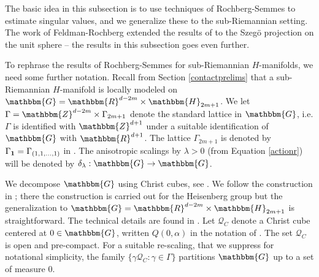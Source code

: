 \documentclass[10pt]{amsart}
\theoremstyle{remark}
\theoremstyle{definition}
\begin{document}
The basic idea in this subsection is to use techniques of Rochberg-Semmes \cite{rochbergsemmes} to estimate singular values, and we generalize these to the sub-Riemannian setting. The work of Feldman-Rochberg \cite{feldmanrochberg} extended the results of \cite{rochbergsemmes} to the Szeg\"o projection on the unit sphere -- the results in this subsection goes even further. 

To rephrase the results of Rochberg-Semmes for sub-Riemannian $H$-manifolds, we need some further notation. Recall from Section \ref{contactprelims} that a sub-Riemannian $H$-manifold is locally modeled on $\mathbbm{G}={\mathbbm{R}}^{d-2m}\times \mathbbm{H}_{2m+1}$. We let $\Gamma={\mathbbm{Z}}^{d-2m}\times \Gamma_{2m+1}$ denote the standard lattice in $\mathbbm{G}$, i.e. $\Gamma$ is identified with ${\mathbbm{Z}}^{d+1}$ under a suitable identification of $\mathbbm{G}$ with ${\mathbbm{R}}^{d+1}$. The lattice $\Gamma_{2m+1}$ is denoted by $\Gamma_{\bf 1}=\Gamma_{(1,1,\ldots,1)}$ in \cite{follandcr}. The anisotropic scalings by $\lambda>0$ (from Equation \eqref{actionr}) will be denoted by $\delta_\lambda:\mathbbm{G}\to \mathbbm{G}$. 

We decompose $\mathbbm{G}$ using Christ cubes, see \cite{christcubepap}. We follow the construction in \cite[Section 2.C1]{meyersonpaper}; there the construction is carried out for the Heisenberg group but the generalization to $\mathbbm{G}={\mathbbm{R}}^{d-2m}\times \mathbbm{H}_{2m+1}$ is straightforward. The technical details are found in \cite[Section 3]{christcubepap}. Let $\mathcal{Q}_C$ denote a Christ cube centered at $0\in \mathbbm{G}$, written $Q(0,\alpha)$ in the notation of \cite[Section 2.C1]{meyersonpaper}. The set $\mathcal{Q}_C$ is open and pre-compact. For a suitable re-scaling, that we suppress for notational simplicity, the family $\{\gamma \mathcal{Q}_C: \gamma \in \Gamma\}$ partitions  $\mathbbm{G}$ up to a set of measure $0$. 
\end{document}
